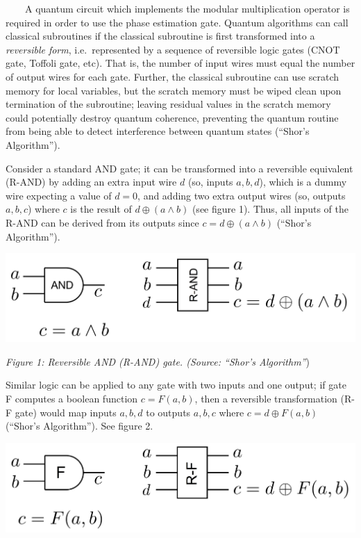 \documentclass[11pt]{article}
\makeatletter
\def\maxwidth{\ifdim\Gin@nat@width>\linewidth\linewidth
    \else\Gin@nat@width\fi}
\let\Oldincludegraphics\includegraphics
\renewcommand{\includegraphics}[1]{\Oldincludegraphics[width=.8\maxwidth]{#1}}
\makeatother
\begin{document}
~~~~A quantum circuit which implements the modular multiplication
operator is required in order to use the phase estimation gate. Quantum
algorithms can call classical subroutines if the classical subroutine is
first transformed into a \emph{reversible form}, i.e.~represented by a
sequence of reversible logic gates (CNOT gate, Toffoli gate, etc). That
is, the number of input wires must equal the number of output wires for
each gate. Further, the classical subroutine can use scratch memory for
local variables, but the scratch memory must be wiped clean upon
termination of the subroutine; leaving residual values in the scratch
memory could potentially destroy quantum coherence, preventing the
quantum routine from being able to detect interference between quantum
states (``Shor's Algorithm'').

Consider a standard AND gate; it can be transformed into a reversible
equivalent (R-AND) by adding an extra input wire \(d\) (so, inputs
\(a, b, d\)), which is a dummy wire expecting a value of \(d=0\), and
adding two extra output wires (so, outputs \(a, b, c\)) where \(c\) is
the result of \(d\oplus (a\wedge b)\) (see figure 1). Thus, all inputs
of the R-AND can be derived from its outputs since
\(c=d\oplus (a\wedge b)\) (``Shor's Algorithm'').

\includegraphics{./r-and-gate.png}

\emph{Figure 1: Reversible AND (R-AND) gate. (Source: ``Shor's
Algorithm''})

 Similar logic can be applied to any gate with two inputs and one
output; if gate F computes a boolean function \(c=F(a,b)\), then a
reversible transformation (R-F gate) would map inputs \(a, b, d\) to
outputs \(a, b, c\) where \(c=d\oplus F(a, b)\) (``Shor's Algorithm'').
See figure 2.

\includegraphics{./r-f-gate.png}
\end{document}
